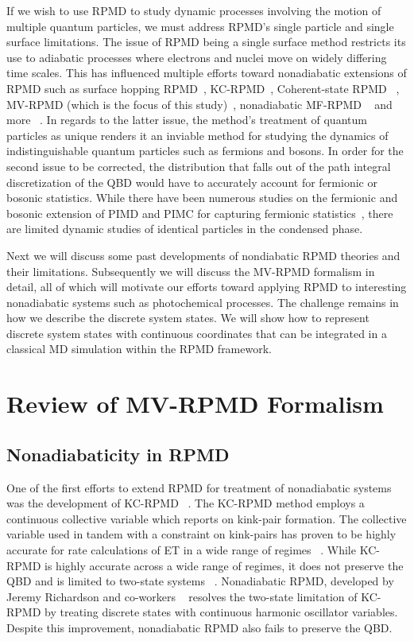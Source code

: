 \documentclass[phd,tocprelim]{cornell}
\begin{document}
If we wish to use RPMD to study dynamic processes involving the motion of multiple quantum particles, we must address RPMD's single particle and single surface limitations.  
The issue of RPMD being a single surface method restricts its use to adiabatic processes where electrons and nuclei move on widely differing time scales. This has influenced multiple efforts toward nonadiabatic extensions of RPMD such as surface hopping RPMD~\cite{HUO2017-2}, KC-RPMD~\cite{TFM2016-2,TFM2014}, Coherent-state RPMD ~\cite{HUO2017}, MV-RPMD (which is the focus of this study)~\cite{NA2013, NA2015, SP2017}, nonadiabatic MF-RPMD ~\cite{JD2016} and more ~\cite{ric13a}. In regards to the latter issue, the method's treatment of quantum particles as unique renders it an inviable method for studying the dynamics of indistinguishable quantum particles such as fermions and bosons. In order for the second issue to be corrected, the distribution that falls out of the path integral discretization of the QBD would have to accurately account for fermionic or bosonic statistics. While there have been numerous studies on the fermionic and bosonic extension of PIMD and PIMC for capturing fermionic statistics~\cite{Okazaki2000, Ceperley2000}, there are limited dynamic studies of identical particles in the condensed phase. 

Next we will discuss some past developments of nondiabatic RPMD theories and their limitations. Subsequently we will discuss the MV-RPMD formalism in detail, all of which will motivate our efforts toward applying RPMD to interesting nonadiabatic systems such as photochemical processes. The challenge remains in how we describe the discrete system states. We will show how to represent discrete system states with continuous coordinates that can be integrated in a classical MD simulation within the RPMD framework. 

\section{Review of MV-RPMD Formalism}
\subsection{Nonadiabaticity in RPMD }
One of the first efforts to extend RPMD for treatment of nonadiabatic systems was the development of KC-RPMD ~\cite{TFM2014,TFM2016-2}. The KC-RPMD method employs a continuous collective variable which reports on kink-pair formation. The collective variable used in tandem with a constraint on kink-pairs has proven to be highly accurate for rate calculations of ET in a wide range of regimes ~\cite{TFM2014,TFM2016-2}. While KC-RPMD is highly accurate across a wide range of regimes, it does not preserve the QBD and is limited to two-state systems ~\cite{TFM2014,TFM2016-2}. Nonadiabatic RPMD, developed by Jeremy Richardson and co-workers ~\cite{ric13a} resolves the two-state limitation of KC-RPMD by treating discrete states with continuous harmonic oscillator variables.  Despite this improvement, nonadiabatic RPMD also fails to preserve the QBD. 
\end{document}
